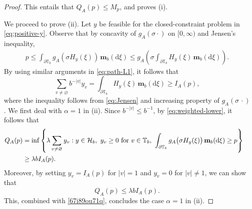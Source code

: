 \documentclass[10pt,a4paper]{amsart}
\begin{document}
\begin{proof}
This entails that \(Q_A(p)\leq M_p\), and proves \textup{(i)}.
\par
We proceed to prove \textup{(ii)}. Let $y$ be feasible for the closed-constraint problem in \eqref{eq:positive-y}. Observe that by concavity of $g_A(\sigma\cdot)$ on $[0,\infty)$ and Jensen's inequality,
\begin{equation}\label{eq:Jensen}
\begin{aligned}
  p\le \int_{\partial\mathbb{T}_b}g_A\left(\sigma H_y(\xi)\right)\,\mathbf m_b(\mathrm{d}\xi)\leq g_A\left(\sigma\int_{\partial\mathbb{T}_b}H_y(\xi)\,\mathbf m_b(\mathrm{d}\xi)\right).
\end{aligned}
\end{equation}
By using similar arguments in \eqref{eq:path-L1}, it follows that
\begin{equation}\label{eq:weighted-lower}
  \sum_{v\ne\varnothing}b^{-\lvert v\rvert}y_v
  =\int_{\partial\mathbb{T}_b}H_y(\xi)\,\mathbf m_b(\mathrm{d}\xi)
  \ge I_A(p),
\end{equation}
where the inequality follows from \eqref{eq:Jensen} and increasing property of \(g_A(\sigma\,\cdot)\). We first deal with
\(\alpha=1\) in (ii).  Since \(b^{-\lvert v\rvert}\le b^{-1}\), by \eqref{eq:weighted-lower}, it follows that
\begin{align}\label{67i89ou71q}
  Q_A(p)&=\inf\left\{\lambda\sum_{v\ne\varnothing}y_v:
    y\in\mathcal{H}_b,~y_v\geq0\ \text{for}\ {v\in\mathbb{T}_b},\ \int_{\partial\mathbb{T}_b}g_A\bigl(\sigma H_{y}(\xi)\bigr)\,\mathbf m_b(\mathrm{d}\xi)\ge p\right\}\cr
    &\geq\lambda bI_A(p).
\end{align}
Moreover, by setting \(y_v=I_A(p)\) for $|v|=1$ and \(y_v=0\) for $|v|\neq1$, we can show that
$$Q_A(p)\leq\lambda bI_A(p).$$
This, combined with \eqref{67i89ou71q}, concludes the case \(\alpha=1\) in \textup{(ii)}.


\end{proof}
\end{document}
